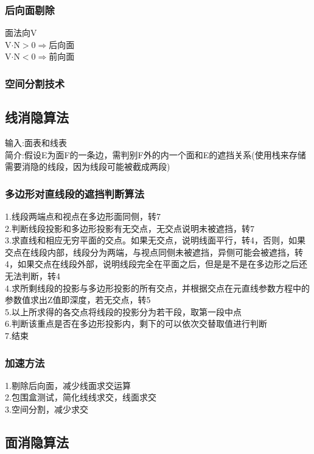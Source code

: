 \documentclass{article}
\begin{document}
\begin{CJK}{UTF8}{gbsn}
	\subsubsection{后向面剔除}
	面法向V\\
	V$\cdot$N$> 0\Rightarrow $后向面\\
	V$\cdot$N$< 0\Rightarrow $前向面\\
	\subsubsection{空间分割技术}
	
	\subsection{线消隐算法}
	输入:面表和线表\\
	简介:假设E为面F的一条边，需判别F外的内一个面和E的遮挡关系(使用栈来存储需要消隐的线段，因为线段可能被截成两段)\\
	\subsubsection{多边形对直线段的遮挡判断算法}
	1.线段两端点和视点在多边形面同侧，转7\\
	2.判断线段投影和多边形投影有无交点，无交点说明未被遮挡，转7\\
	3.求直线和相应无穷平面的交点。如果无交点，说明线面平行，转4，否则，如果交点在线段内部，线段分为两端，与视点同侧未被遮挡，异侧可能会被遮挡，转4，如果交点在线段外部，说明线段完全在平面之后，但是是不是在多边形之后还无法判断，转4\\
	4.求所剩线段的投影与多边形投影的所有交点，并根据交点在元直线参数方程中的参数值求出Z值即深度，若无交点，转5\\
	5.以上所求得的各交点将线段的投影分为若干段，取第一段中点\\
	6.判断该重点是否在多边形投影内，剩下的可以依次交替取值进行判断\\
	7.结束\\
	\subsubsection{加速方法}
	1.剔除后向面，减少线面求交运算\\
	2.包围盒测试，简化线线求交，线面求交\\
	3.空间分割，减少求交
	\subsection{面消隐算法}

\end{CJK}
\end{document}
